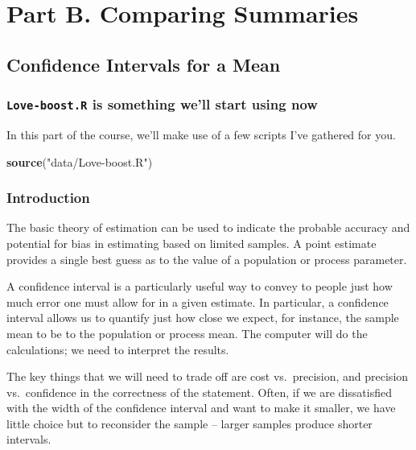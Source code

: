 \documentclass[
]{book}
\newenvironment{Shaded}{\begin{snugshade}}{\end{snugshade}}
\newcommand{\KeywordTok}[1]{\textcolor[rgb]{0.13,0.29,0.53}{\textbf{#1}}}
\newcommand{\NormalTok}[1]{#1}
\newcommand{\StringTok}[1]{\textcolor[rgb]{0.31,0.60,0.02}{#1}}
\begin{document}
\hypertarget{part-part-b.-comparing-summaries}{%
\part*{Part B. Comparing Summaries}\label{part-part-b.-comparing-summaries}}

\hypertarget{confidence-intervals-for-a-mean}{%
\chapter{Confidence Intervals for a Mean}\label{confidence-intervals-for-a-mean}}

\hypertarget{love-boost.r-is-something-well-start-using-now}{%
\section{\texorpdfstring{\texttt{Love-boost.R} is something we'll start using now}{Love-boost.R is something we'll start using now}}\label{love-boost.r-is-something-well-start-using-now}}

In this part of the course, we'll make use of a few scripts I've gathered for you.

\begin{Shaded}
\begin{Highlighting}[]
\KeywordTok{source}\NormalTok{(}\StringTok{"data/Love-boost.R"}\NormalTok{)}
\end{Highlighting}
\end{Shaded}

\hypertarget{introduction}{%
\section{Introduction}\label{introduction}}

The basic theory of estimation can be used to indicate the probable accuracy and potential for bias in estimating based on limited samples. A point estimate provides a single best guess as to the value of a population or process parameter.

A confidence interval is a particularly useful way to convey to people just how much error one must allow for in a given estimate. In particular, a confidence interval allows us to quantify just how close we expect, for instance, the sample mean to be to the population or process mean. The computer will do the calculations; we need to interpret the results.

The key things that we will need to trade off are cost vs.~precision, and precision vs.~confidence in the correctness of the statement. Often, if we are dissatisfied with the width of the confidence interval and want to make it smaller, we have little choice but to reconsider the sample -- larger samples produce shorter intervals.
\end{document}

